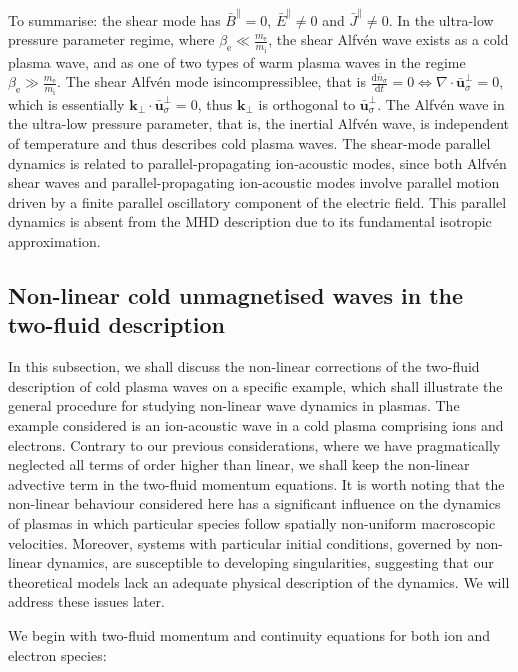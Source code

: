 To summarise: the shear mode has $\bar{B}^\parallel=0$, $\bar{E}^\parallel\neq0$ and $\bar{J}^\parallel\neq0$. In the ultra-low pressure parameter regime, where $\beta_\text{e}\ll\frac{m_\text{e}}{m_\mathrm{i}}$, the shear Alfvén wave exists as a cold plasma wave, and as one of two types of warm plasma waves in the regime $\beta_\text{e}\gg\frac{m_\text{e}}{m_\mathrm{i}}$. The shear Alfvén mode isincompressiblee, that is $\frac{\mathrm{d}\bar{n}_\sigma}{\mathrm{d}t}=0\Longleftrightarrow\nabla\cdot\bar{\mathbf{u}}_\sigma^\perp=0$, which is essentially  $\mathbf{k}_\perp\cdot\bar{\mathbf{u}}_\sigma^\perp=0$, thus $\mathbf{k}_\perp$ is orthogonal to $\bar{\mathbf{u}}_\sigma^\perp$. The Alfvén wave in the ultra-low pressure parameter, that is, the inertial Alfvén wave, is independent of temperature and thus describes cold plasma waves. The shear-mode parallel dynamics is related to parallel-propagating ion-acoustic modes, since both Alfvén shear waves and parallel-propagating ion-acoustic modes involve parallel motion driven by a finite parallel oscillatory component of the electric field. This parallel dynamics is absent from the MHD description due to its fundamental isotropic approximation.

\subsection{Non-linear cold unmagnetised waves in the two-fluid description}

In this subsection, we shall discuss the non-linear corrections of the two-fluid description of cold plasma waves on a specific example, which shall illustrate the general procedure for studying non-linear wave dynamics in plasmas. The example considered is an ion-acoustic wave in a cold plasma comprising ions and electrons. Contrary to our previous considerations, where we have pragmatically neglected all terms of order higher than linear, we shall keep the non-linear advective term in the two-fluid momentum equations. It is worth noting that the non-linear behaviour considered here has a significant influence on the dynamics of plasmas in which particular species follow spatially non-uniform macroscopic velocities. Moreover, systems with particular initial conditions, governed by non-linear dynamics, are susceptible to developing singularities, suggesting that our theoretical models lack an adequate physical description of the dynamics. We will address these issues later.

\quad We begin with two-fluid momentum and continuity equations for both ion and electron species:

